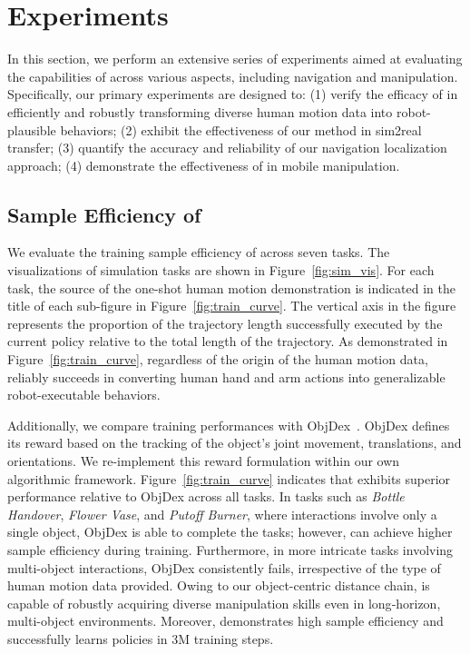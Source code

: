 \section{Experiments}
In this section, we perform an extensive series of experiments aimed at evaluating the capabilities of \ourshort across various aspects, including navigation and manipulation. Specifically, our primary experiments are designed to: (1) verify the efficacy of \ourshort in efficiently and robustly transforming diverse human motion data into robot-plausible behaviors; (2) exhibit the effectiveness of our method in sim2real transfer; (3) quantify the accuracy and reliability of our navigation localization approach; (4) demonstrate the effectiveness of \ourshort in mobile manipulation. 

\subsection{Sample Efficiency of \ourshort}

We evaluate the training sample efficiency of \ourshort across seven tasks. The visualizations of simulation tasks are shown in Figure~\ref{fig:sim_vis}. For each task, the source of the one-shot human motion demonstration is indicated in the title of each sub-figure in Figure~\ref{fig:train_curve}. The vertical axis in the figure represents the proportion of the trajectory length successfully executed by the current policy relative to the total length of the trajectory. As demonstrated in Figure~\ref{fig:train_curve}, regardless of the origin of the human motion data, \ourshort reliably succeeds in converting human hand and arm actions into generalizable robot-executable behaviors.


Additionally, we compare training performances with ObjDex~\cite{chenobject}. ObjDex defines its reward based on the tracking of the object's joint movement, translations, and orientations. We re-implement this reward formulation within our own algorithmic framework. Figure~\ref{fig:train_curve} indicates that \ourshort exhibits superior performance relative to ObjDex across all tasks. In tasks such as \textit{Bottle Handover}, \textit{Flower Vase}, and \textit{Putoff Burner}, where interactions involve only a single object, ObjDex is able to complete the tasks; however, \ourshort can achieve higher sample efficiency during training. Furthermore, in more intricate tasks involving multi-object interactions, ObjDex consistently fails, irrespective of the type of human motion data provided. Owing to our object-centric distance chain, \ourshort is capable of robustly acquiring diverse manipulation skills even in long‑horizon, multi-object environments. Moreover, \ourshort demonstrates high sample efficiency and successfully learns policies in 3M training steps.


